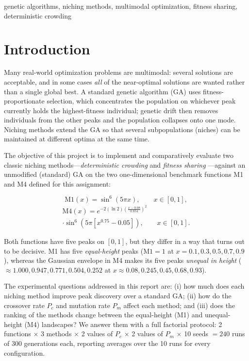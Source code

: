 \documentclass[conference]{IEEEtran}
\begin{document}
\begin{IEEEkeywords}
genetic algorithms, niching methods, multimodal optimization, fitness sharing,
deterministic crowding
\end{IEEEkeywords}

\section{Introduction}
\label{sec:intro}

Many real-world optimization problems are multimodal: several solutions are
acceptable, and in some cases \emph{all} of the near-optimal solutions are
wanted rather than a single global best. A standard genetic algorithm (GA)
\cite{b1} uses fitness-proportionate selection, which concentrates the
population on whichever peak currently holds the highest-fitness individual;
genetic drift then removes individuals from the other peaks and the population
collapses onto one mode. Niching methods \cite{b2,b3} extend the GA so that
several subpopulations (niches) can be maintained at different optima at the
same time.

The objective of this project is to implement and comparatively evaluate two
classic niching methods---\emph{deterministic crowding} \cite{b2} and
\emph{fitness sharing} \cite{b3}---against an unmodified (standard) GA on the
two one-dimensional benchmark functions M1 and M4 defined for this assignment:

\begin{equation}
\mathrm{M1}(x) = \sin^{6}(5\pi x), \qquad x \in [0,1],
\label{eq:m1}
\end{equation}
\begin{multline}
\mathrm{M4}(x) = e^{-2(\ln 2)\left(\frac{x-0.08}{0.854}\right)^{2}}\\
\cdot \sin^{6}\!\left(5\pi\left[x^{0.75}-0.05\right]\right), \qquad x \in [0,1].
\label{eq:m4}
\end{multline}

Both functions have five peaks on $[0,1]$, but they differ in a way that turns
out to be decisive. M1 has five \emph{equal-height} peaks
($\mathrm{M1}=1$ at $x = 0.1, 0.3, 0.5, 0.7, 0.9$), whereas the Gaussian
envelope in M4 makes its five peaks \emph{unequal in height}
($\approx 1.000, 0.947, 0.771, 0.504, 0.252$ at
$x \approx 0.08, 0.245, 0.45, 0.68, 0.93$).

The experimental questions addressed in this report are: (i) how much does
each niching method improve peak discovery over a standard GA; (ii) how do the
crossover rate $P_c$ and mutation rate $P_m$ affect each method; and (iii)
does the ranking of the methods change between the equal-height (M1) and
unequal-height (M4) landscapes? We answer them with a full factorial protocol:
2 functions $\times$ 3 methods $\times$ 2 values of $P_c$ $\times$ 2 values of
$P_m$ $\times$ 10 seeds $= 240$ runs of 300 generations each, reporting
averages over the 10 runs for every configuration.
\end{document}
